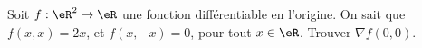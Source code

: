 \begin{exercice}\label{exodevoir2-0003}
 

Soit $f:\eR^2\to \eR$ une fonction différentiable en l'origine. On sait que  
$ f(x,x)=2x$, et $f(x,-x)=0$, pour tout $ x\in\eR$. Trouver $\nabla f(0,0)$.

\end{exercice}
